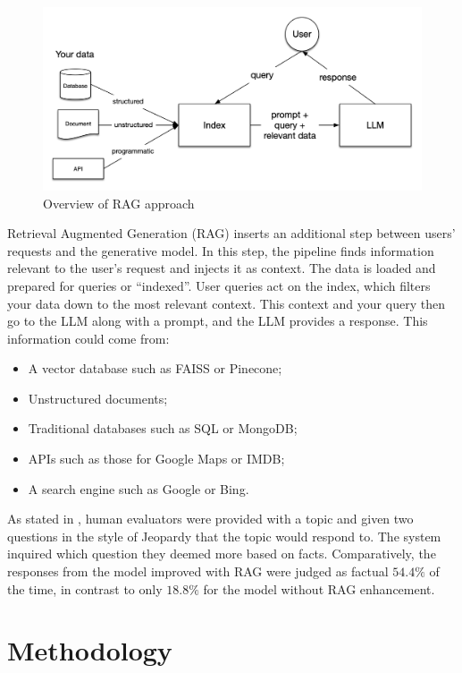 \documentclass[conference, 11pt]{IEEEtran}
\begin{document}
\begin{figure}[h]
\centering
\includegraphics[width=1.0\linewidth]{basic_rag.png}
\caption{Overview of RAG approach \cite{llamaindex_rag}}
\end{figure}

Retrieval Augmented Generation (RAG) \cite{rag} inserts an additional step between users' requests and the generative model. In this step, the pipeline finds information relevant to the user's request and injects it as context. The data is loaded and prepared for queries or ``indexed''. User queries act on the index, which filters your data down to the most relevant context. This context and your query then go to the LLM along with a prompt, and the LLM provides a response. This information could come from:
\begin{itemize}
    \item A vector database such as FAISS \cite{faiss} or Pinecone;
    \item Unstructured documents;
    \item Traditional databases such as SQL or MongoDB;
    \item APIs such as those for Google Maps or IMDB;
    \item A search engine such as Google or Bing.
\end{itemize}

As stated in \cite{rag}, human evaluators were provided with a topic and given two questions in the style of Jeopardy that the topic would respond to. The system inquired which question they deemed more based on facts. Comparatively, the responses from the model improved with RAG were judged as factual $54.4\%$ of the time, in contrast to only $18.8\%$ for the model without RAG enhancement.


\section{Methodology}
\end{document}

